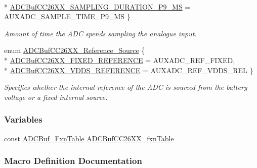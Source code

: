 \begin{DoxyCompactItemize}
\\*
\hyperlink{_a_d_c_buf_c_c26_x_x_8h_a4a95bf383dea0206b6708496a034a9fbaf5746a2bb589e0fc237dfe7cea002859}{A\+D\+C\+Buf\+C\+C26\+X\+X\+\_\+\+S\+A\+M\+P\+L\+I\+N\+G\+\_\+\+D\+U\+R\+A\+T\+I\+O\+N\+\_\+P9\+\_\+\+M\+S} = A\+U\+X\+A\+D\+C\+\_\+\+S\+A\+M\+P\+L\+E\+\_\+\+T\+I\+M\+E\+\_\+P9\+\_\+\+M\+S
 \}
\begin{DoxyCompactList}\small\item\em Amount of time the A\+D\+C spends sampling the analogue input. \end{DoxyCompactList}\item 
enum \hyperlink{_a_d_c_buf_c_c26_x_x_8h_a31a41d718712f3d4ff936bb566da0d0a}{A\+D\+C\+Buf\+C\+C26\+X\+X\+\_\+\+Reference\+\_\+\+Source} \{ \\*
\hyperlink{_a_d_c_buf_c_c26_x_x_8h_a31a41d718712f3d4ff936bb566da0d0aad02c445be8959c127744cfe9519d1770}{A\+D\+C\+Buf\+C\+C26\+X\+X\+\_\+\+F\+I\+X\+E\+D\+\_\+\+R\+E\+F\+E\+R\+E\+N\+C\+E} = A\+U\+X\+A\+D\+C\+\_\+\+R\+E\+F\+\_\+\+F\+I\+X\+E\+D, 
\\*
\hyperlink{_a_d_c_buf_c_c26_x_x_8h_a31a41d718712f3d4ff936bb566da0d0aa4b0c0d3239bf0e32219c87df11baa0c9}{A\+D\+C\+Buf\+C\+C26\+X\+X\+\_\+\+V\+D\+D\+S\+\_\+\+R\+E\+F\+E\+R\+E\+N\+C\+E} = A\+U\+X\+A\+D\+C\+\_\+\+R\+E\+F\+\_\+\+V\+D\+D\+S\+\_\+\+R\+E\+L
 \}
\begin{DoxyCompactList}\small\item\em Specifies whether the internal reference of the A\+D\+C is sourced from the battery voltage or a fixed internal source. \end{DoxyCompactList}\end{DoxyCompactItemize}
\subsubsection*{Variables}
\begin{DoxyCompactItemize}
\item 
const \hyperlink{struct_a_d_c_buf___fxn_table}{A\+D\+C\+Buf\+\_\+\+Fxn\+Table} \hyperlink{_a_d_c_buf_c_c26_x_x_8h_ab26fa75463dae8b7a8c9d7585735177a}{A\+D\+C\+Buf\+C\+C26\+X\+X\+\_\+fxn\+Table}
\end{DoxyCompactItemize}


\subsubsection{Macro Definition Documentation}
